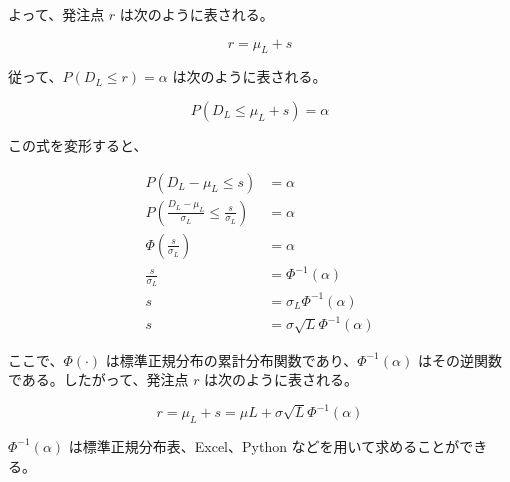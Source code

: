 \documentclass[
  japanese,
  letterpaper,
]{ltjbook}
\theoremstyle{plain}
\theoremstyle{definition}
\theoremstyle{remark}
\begin{document}
よって、発注点 \(r\) は次のように表される。

\[
r = \mu_L + s
\]

従って、\(P(D_L \leq r) = \alpha\) は次のように表される。

\[
P(D_L \leq \mu_L + s) = \alpha
\]

この式を変形すると、

\begin{align}
P(D_L - \mu_L \leq s) &= \alpha \\
P\left(\frac{D_L - \mu_L}{\sigma_L} \leq \frac{s}{\sigma_L}\right) &= \alpha \\
\Phi\left(\frac{s}{\sigma_L}\right) &= \alpha \\
\frac{s}{\sigma_L} &= \Phi^{-1}(\alpha) \\
s &= \sigma_L \Phi^{-1}(\alpha) \\
s &= \sigma \sqrt{L} \Phi^{-1}(\alpha)
\end{align}

ここで、\(\Phi(\cdot)\)
は標準正規分布の累計分布関数であり、\(\Phi^{-1}(\alpha)\)
はその逆関数である。したがって、発注点 \(r\) は次のように表される。

\[
r = \mu_L + s = \mu L + \sigma \sqrt{L} \Phi^{-1}(\alpha)
\]

\(\Phi^{-1}(\alpha)\) は標準正規分布表、Excel、Python
などを用いて求めることができる。
\end{document}

